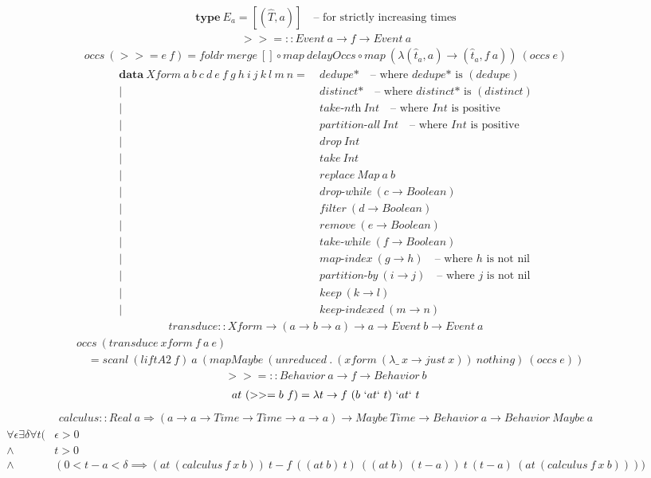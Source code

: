 \documentclass[fleqn]{amsart}
\newcommand{\zeroarity}[1]{&\ \textit{#1*}\quad\text{-- where }\textit{#1*}\text{ is }(#1)}
\newcommand{\positive}[1]{&\ \textit{#1}\ Int\quad\text{-- where }Int\text{ is positive}}
\newcommand{\integer}[1]{&\ #1\ Int}
\newcommand{\predicate}[2]{&\ \textit{#1}\ (#2 \rightarrow Boolean)}
\newcommand{\nonnillable}[3]{&\ \textit{#1}\ (#2 \rightarrow #3)\quad\text{-- where }#3\text{ is not nil}}
\newcommand{\any}[3]{&\ \textit{#1}\ (#2 \rightarrow #3)}
\begin{document}
\begin{align*}
  \textbf{type}\ E_a = [(\hat{T}, a)]\quad\text{-- for strictly increasing times}
\end{align*}
\begin{align*}
  >>= :: Event\ a \rightarrow f \rightarrow Event\ a
\end{align*}
\begin{align*}
  occs\ (>>= e\ f) = foldr\ merge\ []\circ map\ delayOccs\circ map\ (\lambda(\hat{t}_a, a) \rightarrow (\hat{t}_a , f\ a))\ (occs\ e)
\end{align*}
\begin{align*}
  \mathbf{data}\ Xform\ a\ b\ c\ d\ e\ f\ g\ h\ i\ j\ k\ l\ m\ n =\zeroarity{dedupe}\\
  |\zeroarity{distinct}\\
  |\positive{take-nth}\\
  |\positive{partition-all}\\
  |\integer{drop}\\
  |\integer{take}\\
  |&\ replace\ Map\ a\ b\\
  |\predicate{drop-while}{c}\\
  |\predicate{filter}{d}\\
  |\predicate{remove}{e}\\
  |\predicate{take-while}{f}\\
  |\nonnillable{map-index}{g}{h}\\
  |\nonnillable{partition-by}{i}{j}\\
  |\any{keep}{k}{l}\\
  |\any{keep-indexed}{m}{n}
\end{align*}
\begin{align*}
  transduce :: Xform \rightarrow (a \rightarrow b \rightarrow a) \rightarrow a \rightarrow Event\ b \rightarrow Event\ a
\end{align*}
\begin{align*}
  &occs\ (transduce\ xform\ f\ a\ e)\\
  &\quad= scanl\ (liftA2\ f)\ a\ (mapMaybe\ (unreduced\ .\ (xform\ (\lambda\_\ x\rightarrow just\ x))\ nothing)\ (occs\ e))
\end{align*}
\begin{align*}
  >>= :: Behavior\ a \rightarrow f \rightarrow Behavior\ b
\end{align*}
\begin{align*}
  at\ (>>= b\ f) =\lambda t \rightarrow f\ (b\ `at` \ t)\ `at` \ t
\end{align*}
\begin{align*}
  calculus :: Real\ a\Rightarrow (a \rightarrow a \rightarrow Time \rightarrow Time \rightarrow a \rightarrow a) \rightarrow Maybe\ Time \rightarrow Behavior\ a\rightarrow Behavior\ Maybe\ a
\end{align*}
\begin{align*}
  \forall\epsilon\exists\delta\forall t(&\epsilon > 0\\
  \wedge& t > 0\\
  \wedge& (0 < t - a < \delta \implies(at\ (calculus\ f\ x\ b))\ t - f\ ((at\ b)\ t)\ ((at\ b)\ (t - a))\ t\ (t - a)\ (at\ (calculus\ f \ x\ b))))
\end{align*}
\end{document}
